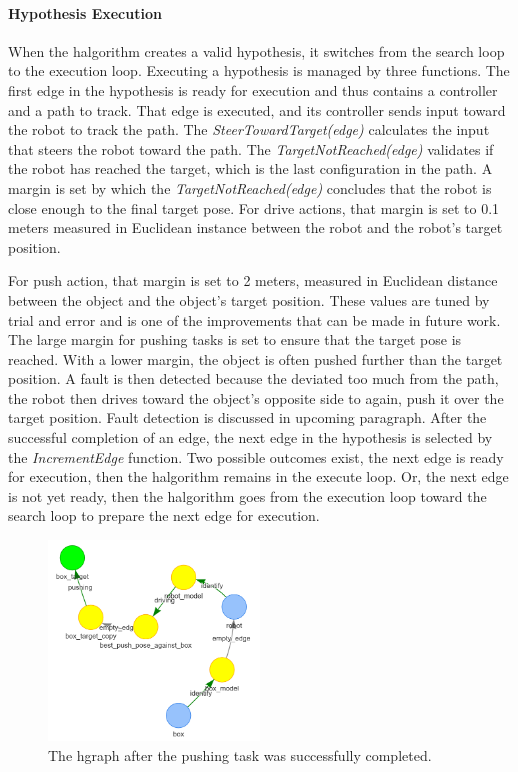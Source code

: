 \paragraph{Hypothesis Execution}
When the \ac{halgorithm} creates a valid hypothesis, it switches from the search loop to the execution loop. Executing a hypothesis is managed by three functions. The first edge in the hypothesis is ready for execution and thus contains a controller and a path to track. That edge is executed, and its controller sends input toward the robot to track the path. The \textit{SteerTowardTarget(\gls{edge})} calculates the input that steers the robot toward the path. The \textit{TargetNotReached(\gls{edge})} validates if the robot has reached the target, which is the last configuration in the path. A margin is set by which the \textit{TargetNotReached(\gls{edge})} concludes that the robot is close enough to the final target pose. For drive actions, that margin is set to 0.1 meters measured in Euclidean instance between the robot and the robot's target position.

For push action, that margin is set to 2 meters, measured in Euclidean distance between the object and the object's target position. These values are tuned by trial and error and is one of the improvements that can be made in future work. The large margin for pushing tasks is set to ensure that the target pose is reached. With a lower margin, the object is often pushed further than the target position. A fault is then detected because the deviated too much from the path, the robot then drives toward the object's opposite side to again, push it over the target position. Fault detection is discussed in upcoming paragraph. After the successful completion of an edge, the next edge in the hypothesis is selected by the \textit{IncrementEdge} function. Two possible outcomes exist, the next edge is ready for execution, then the \ac{halgorithm} remains in the execute loop. Or, the next edge is not yet ready, then the \ac{halgorithm} goes from the execution loop toward the search loop to prepare the next edge for execution.\bs

\begin{figure}[H]
    \centering
    \includegraphics[width=0.5\textwidth]{figures/proposed_method/connecting_nodes/robot_push/robot_push_6}
    \caption{The \ac{hgraph} after the pushing task was successfully completed.}%
    \label{fig:robot_push_5}
\end{figure}


